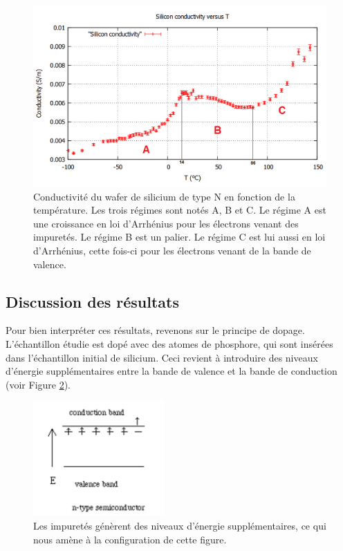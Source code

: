 \begin{figure}[hb]
  \begin{center}
		\includegraphics[width=12cm]{./images/Conductivite_Silicium_finale_english.png}
		\caption{Conductivité du wafer de silicium de type N en fonction de la température. Les trois régimes sont notés A, B et C. Le régime A est une croissance en loi d'Arrhénius pour les électrons venant des impuretés. Le régime B est un palier. Le régime C est lui aussi en loi d'Arrhénius, cette fois-ci pour les électrons venant de la bande de valence.}
		\label{courbe_silicium}
	\end{center}
\end{figure}

\subsection{Discussion des résultats}
Pour bien interpréter ces résultats, revenons sur le principe de dopage. L'échantillon étudie est dopé avec des atomes de phosphore, qui sont insérées dans l'échantillon initial de silicium. Ceci revient à introduire des niveaux d'énergie supplémentaires entre la bande de valence et la bande de conduction (voir Figure \ref{doping}).

\begin{figure}[ht]
  \begin{center}
		\includegraphics[width=5cm]{./images/doping.png}
		\caption{Les impuretés génèrent des niveaux d'énergie supplémentaires, ce qui nous amène à la configuration de cette figure.}
		\label{doping}
	\end{center}
\end{figure}

